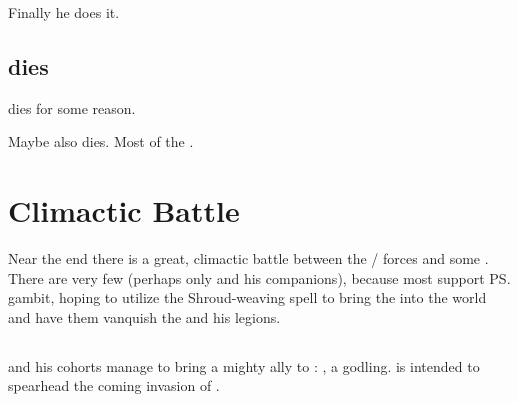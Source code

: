 Finally he does it. 









\subsection{\Harbeth dies}
\Harbeth dies for some reason. 

Maybe \Zereth also dies. 
Most of the . 















\section{Climactic Battle}
Near the end there is a great, climactic battle between the \bane/\resphan{} forces and some . 
There are very few \dragons{} (perhaps only \Ishnaruchaefir{} and his companions), because most \dragons{} support \ps{\Secherdamon} gambit, hoping to utilize the \pps{\banes}{} Shroud-weaving spell to bring the \firstgendragons{} into the world and have them vanquish the \Voidbringer{} and his legions.







\subsection{\HothNrul}
\Vizsherioch{} and his cohorts manage to bring a mighty ally to \Miith: 
, a \xsic{} godling. 
\HothNrul{} is intended to spearhead the coming \xs{} invasion of \Miith. 

